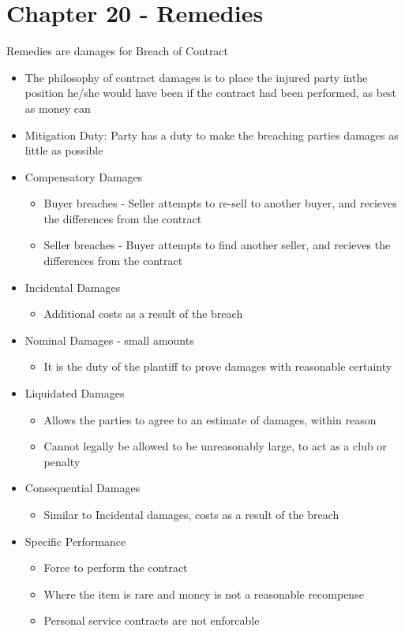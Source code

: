 \documentclass{article}
\begin{document}
	    \section*{Chapter 20 - Remedies}
	    Remedies are damages for Breach of Contract
	    \begin{itemize}
	      \item The philosophy of contract damages is to place the injured party inthe position he/she would have been if the contract had been performed, as best as money can
          \item Mitigation Duty: Party has a duty to make the breaching parties damages as little as possible
	      \item Compensatory Damages
	      \begin{itemize}
	        \item Buyer breaches - Seller attempts to re-sell to another buyer, and recieves the differences from the contract
	        \item Seller breaches - Buyer attempts to find another seller, and recieves the differences from the contract
        \end{itemize}
        \item Incidental Damages
        \begin{itemize}
          \item Additional costs as a result of the breach
        \end{itemize}
        \item Nominal Damages - small amounts
        \begin{itemize}
          \item It is the duty of the plantiff to prove damages with reasonable certainty
        \end{itemize}  
        \item Liquidated Damages
        \begin{itemize}
          \item Allows the parties to agree to an estimate of damages, within reason
          \item Cannot legally be allowed to be unreasonably large, to act as a club or penalty
        \end{itemize}
        \item Consequential Damages
        \begin{itemize}
          \item Similar to Incidental damages, costs as a result of the breach
        \end{itemize}	        
        \item Specific Performance
        \begin{itemize}
          \item Force to perform the contract
          \item Where the item is rare and money is not a reasonable recompense
          \item Personal service contracts are not enforcable
        \end{itemize}
	    \end{itemize}
\end{document}
